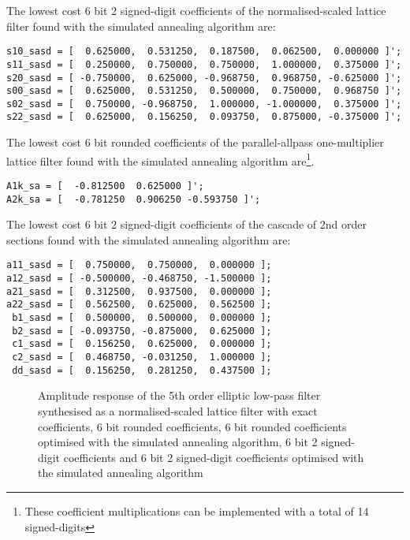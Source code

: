 \documentclass[a4paper,twoside,10pt,english]{report}
\begin{document}
The lowest cost 6 bit 2 signed-digit coefficients of the normalised-scaled 
lattice filter found with the simulated annealing algorithm are:
\begin{small}
\begin{verbatim}
s10_sasd = [  0.625000,  0.531250,  0.187500,  0.062500,  0.000000 ]';
s11_sasd = [  0.250000,  0.750000,  0.750000,  1.000000,  0.375000 ]';
s20_sasd = [ -0.750000,  0.625000, -0.968750,  0.968750, -0.625000 ]';
s00_sasd = [  0.625000,  0.531250,  0.500000,  0.750000,  0.968750 ]';
s02_sasd = [  0.750000, -0.968750,  1.000000, -1.000000,  0.375000 ]';
s22_sasd = [  0.625000,  0.156250,  0.093750,  0.875000, -0.375000 ]';
\end{verbatim}
\end{small}
The lowest cost 6 bit rounded coefficients of the parallel-allpass
one-multiplier lattice filter found with the simulated annealing algorithm 
are\footnote{These coefficient multiplications can be implemented with a total 
of 14 signed-digits}.
\begin{small}
\begin{verbatim}
A1k_sa = [  -0.812500  0.625000 ]';
A2k_sa = [  -0.781250  0.906250 -0.593750 ]';
\end{verbatim}
\end{small}
The lowest cost 6 bit 2 signed-digit coefficients of the cascade of 2nd
order sections found with the simulated annealing algorithm are:
\begin{small}
\begin{verbatim}
a11_sasd = [  0.750000,  0.750000,  0.000000 ];
a12_sasd = [ -0.500000, -0.468750, -1.500000 ];
a21_sasd = [  0.312500,  0.937500,  0.000000 ];
a22_sasd = [  0.562500,  0.625000,  0.562500 ];
 b1_sasd = [  0.500000,  0.500000,  0.000000 ];
 b2_sasd = [ -0.093750, -0.875000,  0.625000 ];
 c1_sasd = [  0.156250,  0.625000,  0.000000 ];
 c2_sasd = [  0.468750, -0.031250,  1.000000 ];
 dd_sasd = [  0.156250,  0.281250,  0.437500 ];
\end{verbatim}
\end{small}
\begin{figure}[!htbp]
\begin{center}
\scalebox{0.7}{}
\caption{Amplitude response of the 5th order elliptic low-pass
filter synthesised as a normalised-scaled lattice filter with exact
coefficients, 6 bit rounded coefficients, 6 bit rounded coefficients
optimised with the simulated annealing algorithm, 6 bit 2 signed-digit 
coefficients and 6 bit 2 signed-digit coefficients optimised with the 
simulated annealing algorithm}
\label{fig:samin_NS_lattice_response}
\end{center}
\end{figure}
\end{document}
